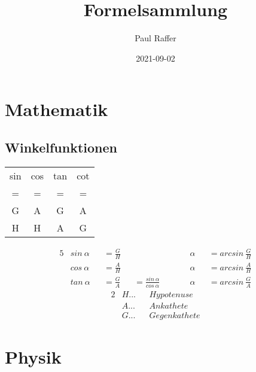 \documentclass[12pt]{article}
\title{Formelsammlung}
\author{Paul Raffer}
\date{2021-09-02}
\begin{document}
	\maketitle
	\newpage

	\tableofcontents
	\newpage

	\section{Mathematik}
		\subsection{Winkelfunktionen}
			\begin{center}
				\begin{tabular}{c|c|c|c}
					sin & cos & tan & cot \\
					=  &  =  &  =  &  =  \\
					G  &  A  &  G  &  A  \\\hline
					H  &  H  &  A  &  G  \\
				\end{tabular}
			\end{center}
			\begin{alignat*}{5}
				&sin\ \alpha &&= \frac{G}{H} &&                                  &&\hspace{2em} \alpha &&= arcsin\ \frac{G}{H} \\
				&cos\ \alpha &&= \frac{A}{H} &&                                  &&\hspace{2em} \alpha &&= arcsin\ \frac{A}{H} \\
				&tan\ \alpha &&= \frac{G}{A} &&= \frac{sin\ \alpha}{cos\ \alpha} &&\hspace{2em} \alpha &&= arcsin\ \frac{G}{A}
			\end{alignat*}
			\begin{alignat*}{2}
				&H...&&Hypotenuse \\
				&A...&&Ankathete \\
				&G...&&Gegenkathete
			\end{alignat*}

	\section{Physik}
\end{document}
